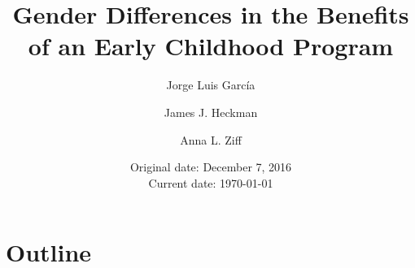 







\title{Gender Differences in the Benefits of an Early Childhood Program}
\author{Jorge Luis Garc\'{i}a \and James J. Heckman \and Anna L. Ziff}
\date{Original date: December 7, 2016 \\ Current date: \today}
\maketitle

\section{Outline}

